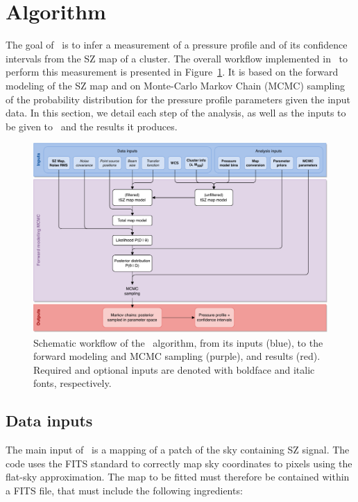 \section{Algorithm} \label{sec:algo}

The goal of \panco\ is to infer a measurement of a pressure profile and of its confidence intervals from the SZ map of a cluster.
The overall workflow implemented in \panco\ to perform this measurement is presented in Figure~\ref{fig:workflow}.
It is based on the forward modeling of the SZ map and on Monte-Carlo Markov Chain (MCMC) sampling of the probability distribution for the pressure profile parameters given the input data.
In this section, we detail each step of the analysis, as well as the inputs to be given to \panco\ and the results it produces.

\begin{figure}[htp]
    \centering
    \includegraphics[width=.9\linewidth]{Figures/workflow.pdf}
    \caption{
        Schematic workflow of the \panco\ algorithm, from its inputs (blue), to the forward modeling and MCMC sampling (purple), and results (red).
        Required and optional inputs are denoted with boldface and italic fonts, respectively.
    }
    \label{fig:workflow}
\end{figure}

\subsection{Data inputs} \label{sec:algo:inputs}

The main input of \panco\ is a mapping of a patch of the sky containing SZ signal.
The code uses the FITS standard \citep{wells_fits_1981} to correctly map sky coordinates to pixels using the flat-sky approximation.
The map to be fitted must therefore be contained within a FITS file, that must include the following ingredients:

